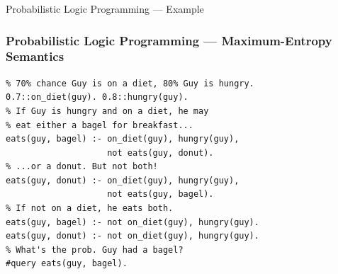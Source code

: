 \documentclass[aspectratio=169]{beamer}
\begin{document}

\begin{frame}[fragile]{Probabilistic Logic Programming --- Example}
\frametitle<6>{Probabilistic Logic Programming --- Maximum-Entropy Semantics}
\begin{minipage}{0.5\textwidth}
\begin{verbatim}
% 70% chance Guy is on a diet, 80% Guy is hungry.
0.7::on_diet(guy). 0.8::hungry(guy).
% If Guy is hungry and on a diet, he may
% eat either a bagel for breakfast...
eats(guy, bagel) :- on_diet(guy), hungry(guy),
                    not eats(guy, donut).
% ...or a donut. But not both!
eats(guy, donut) :- on_diet(guy), hungry(guy),
                    not eats(guy, bagel).
% If not on a diet, he eats both.
eats(guy, bagel) :- not on_diet(guy), hungry(guy).
eats(guy, donut) :- not on_diet(guy), hungry(guy).
% What's the prob. Guy had a bagel?
#query eats(guy, bagel).
\end{verbatim}


\end{minipage}
\end{frame}
\end{document}
